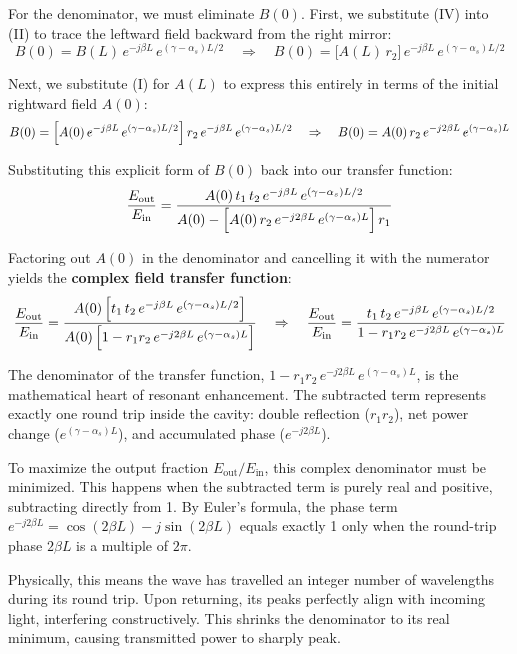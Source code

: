 For the denominator, we must eliminate $B(0)$. First, we substitute \textup{(IV)} into \textup{(II)} to trace the leftward field backward from the right mirror:
\begin{equation*}
    B(0) = B(L)\,e^{-j\beta L}\,e^{(\gamma-\alpha_s)L/2} \quad \Rightarrow \quad B(0) = \bigl[A(L)\,r_2\bigr]\,e^{-j\beta L}\,e^{(\gamma-\alpha_s)L/2}
\end{equation*}

Next, we substitute \textup{(I)} for $A(L)$ to express this entirely in terms of the initial rightward field $A(0)$:
\begin{equation*}
    B(0) = \Bigl[A(0)\,e^{-j\beta L}\,e^{(\gamma-\alpha_s)L/2}\Bigr]\,r_2\,e^{-j\beta L}\,e^{(\gamma-\alpha_s)L/2} \quad \Rightarrow \quad B(0) = A(0)\,r_2\,e^{-j2\beta L}\,e^{(\gamma-\alpha_s)L}
\end{equation*}

Substituting this explicit form of $B(0)$ back into our transfer function:
\begin{equation*}
    \frac{E_{\text{out}}}{E_{\text{in}}} = \frac{A(0)\,t_1\,t_2\,e^{-j\beta L}\,e^{(\gamma-\alpha_s)L/2}}{A(0) - \Bigl[A(0)\,r_2\,e^{-j2\beta L}\,e^{(\gamma-\alpha_s)L}\Bigr]\,r_1}
\end{equation*}

Factoring out $A(0)$ in the denominator and cancelling it with the numerator yields the \textbf{complex field transfer function}:
\begin{equation*}
    \frac{E_{\text{out}}}{E_{\text{in}}} = \frac{A(0)\,\Bigl[t_1\,t_2\,e^{-j\beta L}\,e^{(\gamma-\alpha_s)L/2}\Bigr]}{A(0)\,\Bigl[1 - r_1 r_2\,e^{-j2\beta L}\,e^{(\gamma-\alpha_s)L}\Bigr]} \quad \Rightarrow \quad \frac{E_{\text{out}}}{E_{\text{in}}} = \frac{t_1\,t_2\,e^{-j\beta L}\,e^{(\gamma-\alpha_s)L/2}}{1-r_1 r_2\,e^{-j2\beta L}\,e^{(\gamma-\alpha_s)L}}
\end{equation*}

\begin{keyinsight}
    The denominator of the transfer function, $1 - r_1 r_2\,e^{-j2\beta L}\,e^{(\gamma-\alpha_s)L}$, is the mathematical heart of resonant enhancement. The subtracted term represents exactly one round trip inside the cavity: double reflection ($r_1 r_2$), net power change ($e^{(\gamma-\alpha_s)L}$), and accumulated phase ($e^{-j2\beta L}$).

    To maximize the output fraction $E_{\text{out}}/E_{\text{in}}$, this complex denominator must be minimized. This happens when the subtracted term is purely real and positive, subtracting directly from 1. By Euler's formula, the phase term $e^{-j2\beta L} = \cos(2\beta L) - j\sin(2\beta L)$ equals exactly 1 only when the round-trip phase $2\beta L$ is a multiple of $2\pi$.

    Physically, this means the wave has travelled an integer number of wavelengths during its round trip. Upon returning, its peaks perfectly align with incoming light, interfering constructively. This shrinks the denominator to its real minimum, causing transmitted power to sharply peak.
\end{keyinsight}

